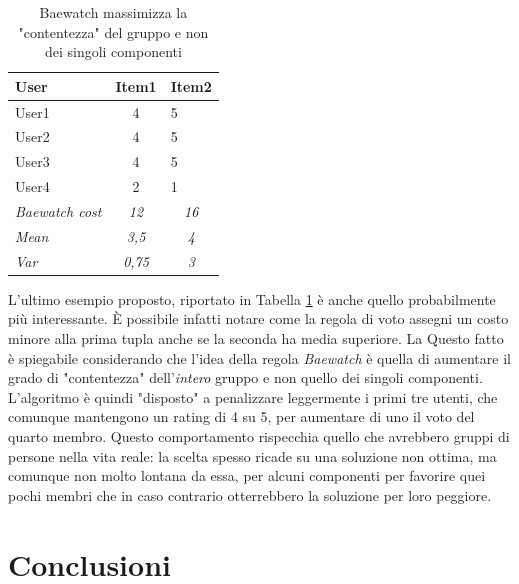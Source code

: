 \documentclass[letterpaper]{article}
\begin{document}
\begin{table}[]
\centering
\begin{tabular}{|l|c|l|}
\hline
\textbf{User}          & \multicolumn{1}{l|}{\textbf{Item1}} & \textbf{Item2}                   \\ \hline
User1                  & 4                                   & 5                                \\ \hline
User2                  & 4                                   & 5                                \\ \hline
User3                  & 4                                   & 5                                \\ \hline
User4                  & 2                                   & 1                                \\ \hline
\textit{Baewatch cost} & \textit{12}                         & \multicolumn{1}{c|}{\textit{16}} \\ \hline
\textit{Mean}          & \textit{3,5}                        & \multicolumn{1}{c|}{\textit{4}}  \\ \hline
\textit{Var}           & \textit{0,75}                       & \multicolumn{1}{c|}{\textit{3}}  \\ \hline
\end{tabular}
\caption{Baewatch massimizza la "contentezza" del gruppo e non dei singoli componenti}
\label{table:5}
\end{table}

L'ultimo esempio proposto, riportato in Tabella \ref{table:5} è anche quello probabilmente più interessante. \`E possibile infatti notare come la regola di voto assegni un costo minore alla prima tupla anche se la seconda ha media superiore. La Questo fatto è spiegabile considerando che l'idea della regola \emph{Baewatch} è quella di aumentare il grado di "contentezza" dell'\emph{intero} gruppo e non quello dei singoli componenti. L'algoritmo è quindi "disposto" a penalizzare leggermente i primi tre utenti, che comunque mantengono un rating di 4 su 5, per aumentare di uno il voto del quarto membro. Questo comportamento rispecchia quello che avrebbero gruppi di persone nella vita reale: la scelta spesso ricade su una soluzione non ottima, ma comunque non molto lontana da essa, per alcuni componenti per favorire quei pochi membri che in caso contrario otterrebbero la soluzione per loro peggiore.

\section{Conclusioni}
\end{document}
